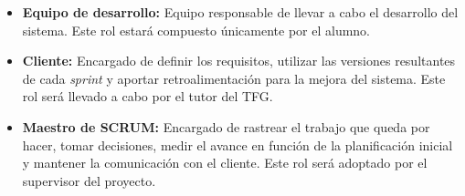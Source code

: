     \begin{itemize}
        \item \textbf{Equipo de desarrollo:} Equipo responsable de llevar a cabo el desarrollo del sistema. Este rol estará compuesto únicamente por el alumno.
        \item \textbf{Cliente:} Encargado de definir los requisitos, utilizar las versiones resultantes de cada \textit{sprint} y aportar retroalimentación para la mejora del sistema. Este rol será llevado a cabo por el tutor del TFG.
        \item \textbf{Maestro de SCRUM:} Encargado de rastrear el trabajo que queda por hacer, tomar decisiones, medir el avance en función de la planificación inicial y mantener la comunicación con el cliente. Este rol será adoptado por el supervisor del proyecto.
    \end{itemize}
    
    

